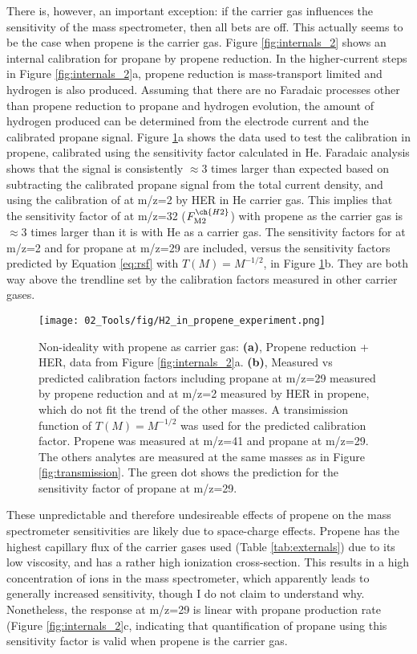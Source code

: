 There is, however, an important exception: if the carrier gas influences the sensitivity of the mass spectrometer, then all bets are off. This actually seems to be the case when propene is the carrier gas. Figure \ref{fig:internals_2} shows an internal calibration for propane by propene reduction. In the higher-current steps in Figure \ref{fig:internals_2}a, propene reduction is mass-transport limited and hydrogen is also produced. Assuming that there are no Faradaic processes other than propene reduction to propane and hydrogen evolution, the amount of hydrogen produced can be determined from the electrode current and the calibrated propane signal. Figure \ref{fig:propene_transmission}a shows the data used to test the  calibration in propene, calibrated using the  sensitivity factor calculated in He. Faradaic analysis shows that the  signal is consistently $\approx 3$ times larger than expected based on subtracting the calibrated propane signal from the total current density, and using the calibration of  at m/z=2 by HER in He carrier gas. This implies that the sensitivity factor of  at m/z=32 ($F_\text{M2}^{\ch{H2}}$) with propene as the carrier gas is $\approx 3$ times larger than it is with He as a carrier gas. The sensitivity factors for  at m/z=2 and for propane at m/z=29 are included, versus the sensitivity factors predicted by Equation \ref{eq:rsf} with $T(M)=M^{-1/2}$, in Figure \ref{fig:propene_transmission}b. They are both way above the trendline set by the calibration factors measured in other carrier gases.
\begin{figure}[h!]
	\texttt{[image: 02\_Tools/fig/H2\_in\_propene\_experiment.png]}
	\caption{Non-ideality with propene as carrier gas: \textbf{(a)}, Propene reduction + HER, data from Figure \ref{fig:internals_2}a. \textbf{(b)}, Measured vs predicted calibration factors including propane at m/z=29 measured by propene reduction and  at m/z=2 measured by HER in propene, which do not fit the trend of the other masses. A transimission function of $T(M) = M^{-1/2}$ was used for the predicted calibration factor. Propene was measured at m/z=41 and propane at m/z=29. The others analytes are measured at the same masses as in Figure \ref{fig:transmission}. The green dot shows the prediction for the sensitivity factor of propane at m/z=29.}
	\label{fig:propene_transmission}
\end{figure}

These unpredictable and therefore undesireable effects of propene on the mass spectrometer sensitivities are likely due to space-charge effects. Propene has the highest capillary flux of the carrier gases used (Table \ref{tab:externals}) due to its low viscosity, and has a rather high ionization cross-section. This results in a high concentration of ions in the mass spectrometer, which apparently leads to generally increased sensitivity, though I do not claim to understand why. Nonetheless, the response at m/z=29 is linear with propane production rate (Figure \ref{fig:internals_2}c, indicating that quantification of propane using this sensitivity factor is valid when propene is the carrier gas.

